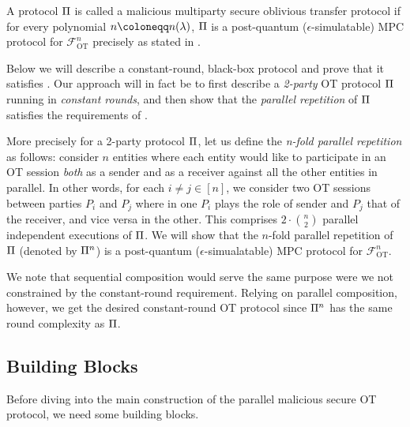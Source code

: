 \fi





\begin{definition}\label{def:eps-mal-par-OT}
A protocol $\mathrm{\Pi}$ is called a malicious  multiparty secure oblivious transfer protocol if for every polynomial $n \coloneqq n(\secpar)$, %
$\mathrm{\Pi}$ %
is a post-quantum ($\epsilon$-simulatable) MPC protocol for $\mathcal{F}^n_{\text{OT}}$ precisely as stated in . 
\end{definition}

Below we will describe a constant-round, black-box protocol and prove that it satisfies . Our approach will in fact be to first describe a {\em 2-party} OT protocol $\mathrm{\Pi}$ running in {\em constant rounds}, and then show that the {\em parallel repetition} of $\mathrm{\Pi}$ satisfies the requirements of .

More precisely for a 2-party protocol $\mathrm{\Pi}$, let us define the {\em n-fold parallel repetition} as follows: consider $n$ entities where each entity would like to participate in an OT session {\em both} as a sender and as a receiver against all the other entities in parallel. In other words, for each $i\neq j \in [n]$, we consider two OT sessions between parties $P_i$ and $P_j$ where in one $P_i$ plays the role of sender and $P_j$ that of the receiver, and vice versa in the other.  
This comprises $2 \cdot \binom{n}{2}$ parallel independent executions of $\mathrm{\Pi}$.  We will show that the $n$-fold %
parallel repetition of $\mathrm{\Pi}$ (denoted by $\mathrm{\Pi}^n$) is a post-quantum ($\epsilon$-simualatable) MPC protocol for $\mathcal{F}^n_{\text{OT}}$. 

We note that sequential composition would serve the same purpose were we not constrained by the constant-round requirement. Relying on parallel composition, however, we get the desired constant-round OT protocol since $\mathrm{\Pi}^n$ has the same round complexity as $\mathrm{\Pi}$. 




\subsection{Building Blocks}
\label{sec:parallelOT:building-blocks}
Before diving into the main construction of the parallel malicious secure OT protocol, we need some building blocks. 


